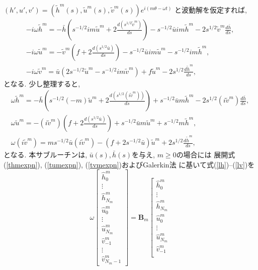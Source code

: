 \documentclass[a4j,fleqn]{jarticle}
\begin{document}
\begin{enumerate}
$(h',u',v')=(\tilde h^m(s),\tilde u^m(s),\tilde v^m(s))
e^{i(m\theta-\omega t)}$
と波動解を仮定すれば,
\begin{gather}
-i\omega\tilde h^m
= 
-\bar h\left(s^{-1/2}im\tilde u^m
   +2\frac{d(s^{1/2}\tilde v^m)}{d s}\right)
   -s^{-1/2}\bar u im\tilde h^m
   -2s^{1/2}\tilde v^m\frac{d\bar h}{ds},
   \\
-i\omega\tilde u^m
= -\tilde v^m\left(f+2\frac{d(s^{1/2}\bar u)}{ds}\right)
   -s^{-1/2}\bar uim\tilde u^m
   -s^{-1/2}im\tilde h^m,
   \\
-i\omega\tilde v^m
=\bar u\left(2s^{-1/2}\tilde u^m
-s^{-1/2}im\tilde v^m\right)
+f\tilde u^m-2s^{1/2}\frac{d\tilde h^m}{ds},
\end{gather}
となる. 少し整理すると,
\begin{gather}
\omega\tilde h^m
= 
-\bar h\left(s^{-1/2}(-m)\tilde u^m
   +2\frac{d(s^{1/2}(i\tilde v^m))}{d s}\right)
   +s^{-1/2}\bar u m\tilde h^m
   -2s^{1/2}(i\tilde v^m)\frac{d\bar h}{ds},
   \label{lh}\\
\omega\tilde u^m
= -(i\tilde v^m)\left(f+2\frac{d(s^{1/2}\bar u)}{ds}\right)
   +s^{-1/2}\bar um\tilde u^m
   +s^{-1/2}m\tilde h^m,
   \label{lu}\\
\omega(i\tilde v^m)
=ms^{-1/2}\bar u(i\tilde v^m)
-(f+2s^{-1/2}\bar u)\tilde u^m
+2s^{1/2}\frac{d\tilde h^m}{ds}\label{lv},
\end{gather}
となる. 本サブルーチンは,
$\bar u(s), \bar h(s)$を与え,
$m\ge 0$の場合には
展開式(\ref{thmexpn}), (\ref{tumexpn}), (\ref{tvmexpn})およびGalerkin法
に基いて式(\ref{lh})--(\ref{lv})を
\[
\omega
\left[
\begin{array}{l}
\hat h^m_0\\
\vdots\\
\hat h^m_{N_m}\\
\hat u^m_0\\
\vdots\\
\hat u^m_{N_m}\\
\hat v^m_{-1}\\
\vdots\\
\hat v^m_{N_m-1}
\end{array}
\right]
={\boldsymbol B}_m
\left[
\begin{array}{l}
\hat h^m_0\\
\vdots\\
\hat h^m_{N_m}\\
\hat u^m_0\\
\vdots\\
\hat u^m_{N_m}\\
\hat v^m_{-1}\\

\end{array}\]
\end{enumerate}
\end{document}

